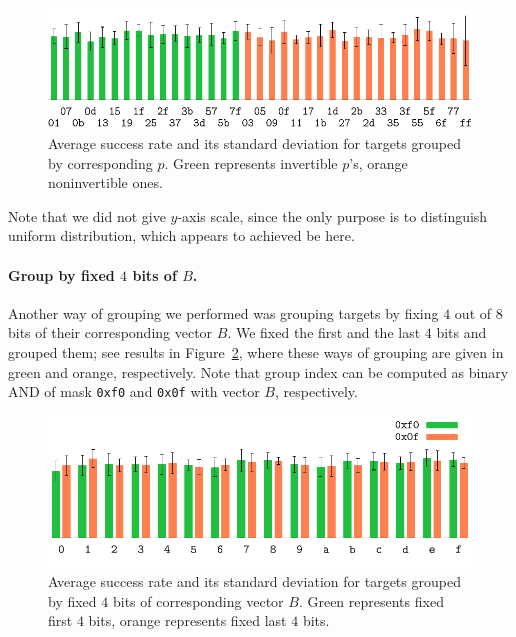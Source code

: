 	\begin{figure}[h]
	\begin{center}
		\includegraphics{figures/leak_target/leak_target.pdf}
		\caption{Average success rate and its standard deviation for targets grouped by corresponding $p$. Green represents invertible $p$'s, orange noninvertible ones.}
		\label{fig:leaktargethist}
	\end{center}
	\end{figure}
	
	Note that we did not give $y$-axis scale, since the only purpose is to distinguish uniform distribution, which appears to achieved be here.
	
	\paragraph{Group by fixed $4$ bits of $B$.}
	
	Another way of grouping we performed was grouping targets by fixing $4$ out of $8$ bits of their corresponding vector $B$. We fixed the first and the last $4$ bits and grouped them; see results in Figure~\ref{fig:leaktargetotherhist}, where these ways of grouping are given in green and orange, respectively. Note that group index can be computed as binary AND of mask {\tt 0xf0} and {\tt 0x0f} with vector $B$, respectively.
	
	\begin{figure}[h]
	\begin{center}
		\includegraphics{figures/leak_target_other/leak_0x0f_0xf0.pdf}
		\caption{Average success rate and its standard deviation for targets grouped by fixed $4$ bits of corresponding vector $B$. Green represents fixed first $4$ bits, orange represents fixed last $4$ bits.}
		\label{fig:leaktargetotherhist}
	\end{center}
	\end{figure}
	
